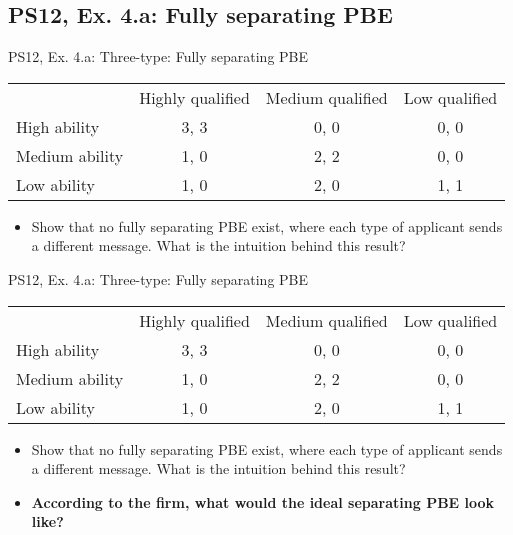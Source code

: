 \subsection{PS12, Ex. 4.a: Fully separating PBE}

\begin{frame}{PS12, Ex. 4.a: Three-type: Fully separating PBE}
    \begin{table}
      \begin{tabular}{l|c|c|c|}
          \multicolumn{1}{c}{} & \multicolumn{1}{c}{Highly qualified} & \multicolumn{1}{c}{Medium qualified} & \multicolumn{1}{c}{Low qualified} \\\cline{2-4}
          High ability   & 3, 3 & 0, 0 & 0, 0 \\\cline{2-4}
          Medium ability & 1, 0 & 2, 2 & 0, 0 \\\cline{2-4}
          Low ability    & 1, 0 & 2, 0 & 1, 1 \\\cline{2-4}
      \end{tabular}
    \end{table}\vspace{-8pt}
    \begin{itemize}
      \item[(a)] Show that no fully separating PBE exist, where each type of applicant sends a different message. What is the intuition behind this result?
    \end{itemize}
    \vfill\null
\end{frame}
\begin{frame}{PS12, Ex. 4.a: Three-type: Fully separating PBE}
    \begin{table}
      \begin{tabular}{l|c|c|c|}
          \multicolumn{1}{c}{} & \multicolumn{1}{c}{Highly qualified} & \multicolumn{1}{c}{Medium qualified} & \multicolumn{1}{c}{Low qualified} \\\cline{2-4}
          High ability   & 3, 3 & 0, 0 & 0, 0 \\\cline{2-4}
          Medium ability & 1, 0 & 2, 2 & 0, 0 \\\cline{2-4}
          Low ability    & 1, 0 & 2, 0 & 1, 1 \\\cline{2-4}
      \end{tabular}
    \end{table}\vspace{-8pt}
    \begin{itemize}
      \item[(a)] Show that no fully separating PBE exist, where each type of applicant sends a different message. What is the intuition behind this result?
      \item[Step 1:] \textbf{According to the firm, what would the ideal separating PBE look like?}
    \end{itemize}
    \vfill\null
\end{frame}
